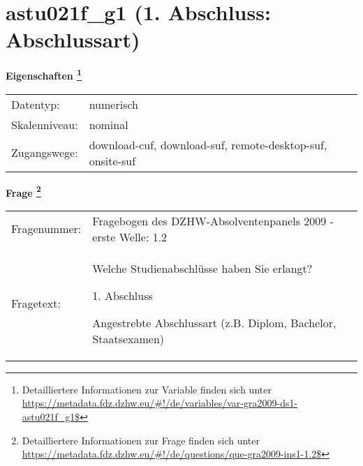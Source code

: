 
    \setcounter{footnote}{0}

    \vspace*{-1.8cm}
	\section{astu021f\_g1 (1. Abschluss: Abschlussart)}
	\label{section:astu021f_g1}



    \vspace*{0.5cm}
    \noindent\textbf{Eigenschaften
	\footnote{Detailliertere Informationen zur Variable finden sich unter
		\url{https://metadata.fdz.dzhw.eu/\#!/de/variables/var-gra2009-ds1-astu021f_g1$}}}\\
	\begin{tabularx}{\hsize}{@{}lX}
	Datentyp: & numerisch \\
	Skalenniveau: & nominal \\
	Zugangswege: &
	  download-cuf, 
	  download-suf, 
	  remote-desktop-suf, 
	  onsite-suf
 \\
    \end{tabularx}



				\vspace*{0.5cm}
                \noindent\textbf{Frage
	                \footnote{Detailliertere Informationen zur Frage finden sich unter
		              \url{https://metadata.fdz.dzhw.eu/\#!/de/questions/que-gra2009-ins1-1.2$}}}\\
				\begin{tabularx}{\hsize}{@{}lX}
					Fragenummer: &
					  Fragebogen des DZHW-Absolventenpanels 2009 - erste Welle:
					  1.2
 \\
					Fragetext: & Welche Studienabschlüsse haben Sie erlangt?\par  1. Abschluss\par  Angestrebte Abschlussart (z.B. Diplom, Bachelor, Staatsexamen) \\
				\end{tabularx}





